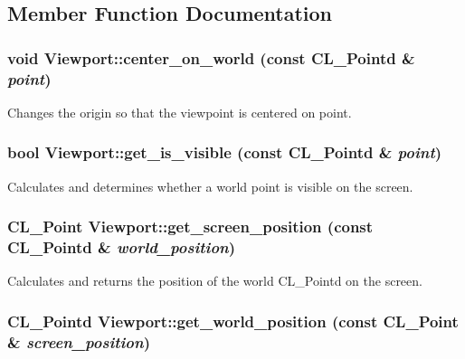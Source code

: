 \subsection{Member Function Documentation}
\hypertarget{classViewport_acacc14d6b2ca0f48734b0ae392938886}{
\subsubsection[{center\_\-on\_\-world}]{\setlength{\rightskip}{0pt plus 5cm}void Viewport::center\_\-on\_\-world (const CL\_\-Pointd \& {\em point})}}
\label{classViewport_acacc14d6b2ca0f48734b0ae392938886}
Changes the origin so that the viewpoint is centered on point. \hypertarget{classViewport_a4a80ef891f5678d6debdaa8a988a5bd0}{
\subsubsection[{get\_\-is\_\-visible}]{\setlength{\rightskip}{0pt plus 5cm}bool Viewport::get\_\-is\_\-visible (const CL\_\-Pointd \& {\em point})}}
\label{classViewport_a4a80ef891f5678d6debdaa8a988a5bd0}
Calculates and determines whether a world point is visible on the screen. \hypertarget{classViewport_a6fa5e4483a38e8775252bfa1467cdc77}{
\subsubsection[{get\_\-screen\_\-position}]{\setlength{\rightskip}{0pt plus 5cm}CL\_\-Point Viewport::get\_\-screen\_\-position (const CL\_\-Pointd \& {\em world\_\-position})}}
\label{classViewport_a6fa5e4483a38e8775252bfa1467cdc77}
Calculates and returns the position of the world CL\_\-Pointd on the screen. \hypertarget{classViewport_a73064b60005187e3762f16618298e651}{
\subsubsection[{get\_\-world\_\-position}]{\setlength{\rightskip}{0pt plus 5cm}CL\_\-Pointd Viewport::get\_\-world\_\-position (const CL\_\-Point \& {\em screen\_\-position})}}
